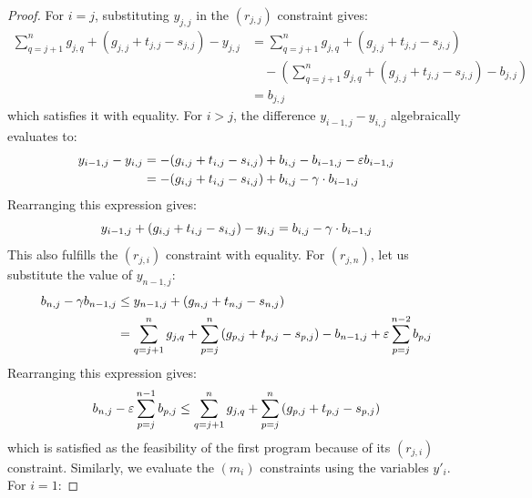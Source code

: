 \begin{proof}
    For $i=j$, substituting $y_{j,j}$ in the $(r_{j,j})$ constraint gives:
    \begin{align*}
        \sum_{q=j+1}^n g_{j,q} + (g_{j,j} + t_{j,j} - s_{j,j}) - y_{j,j}
        &=  \sum_{q=j+1}^n g_{j,q} + (g_{j,j} + t_{j,j} - s_{j,j}) \\
        &\quad - \left(\sum_{q=j+1}^n g_{j,q} + (g_{j,j} + t_{j,j} - s_{j,j}) - b_{j,j}\right) \\
        &= b_{j,j}
    \end{align*}
    which satisfies it with equality. For $i>j$, the difference $y_{i-1,j} - y_{i,j}$ algebraically evaluates to:
    \begin{align*}
        y_{i-1,j} - y_{i,j} 
        &= -(g_{i,j} + t_{i,j} - s_{i,j}) + b_{i,j} - b_{i-1,j} - \varepsilon b_{i-1,j} \\
        &= -(g_{i,j} + t_{i,j} - s_{i,j}) + b_{i,j} - \gamma\cdot b_{i-1,j}
    \end{align*}
    Rearranging this expression gives:
    \begin{equation*}
        y_{i-1,j} + (g_{i,j} + t_{i,j} - s_{i,j}) - y_{i,j} = b_{i,j} - \gamma\cdot b_{i-1,j}
    \end{equation*}
    This also fulfills the $(r_{j,i})$ constraint with equality. For $(r_{j,n})$, let us substitute the value of $y_{n-1,j}$:
    \begin{align*}
        b_{n,j} - \gamma b_{n-1,j}
        &\leq y_{n-1,j} + (g_{n,j} + t_{n,j} - s_{n,j}) \\
        &= \sum_{q=j+1}^n g_{j,q} + \sum_{p=j}^{n} \left(g_{p,j} + t_{p,j} - s_{p,j}\right) - b_{n-1,j} + \varepsilon \sum_{p=j}^{n-2} b_{p,j}
    \end{align*}
    Rearranging this expression gives:
    \begin{equation*}
        b_{n,j} - \varepsilon \sum_{p=j}^{n-1} b_{p,j} \leq \sum_{q=j+1}^n g_{j,q} + \sum_{p=j}^{n} \left(g_{p,j} + t_{p,j} - s_{p,j}\right)
    \end{equation*}
    which is satisfied as the feasibility of the first program because of its $(r_{j,i})$ constraint.
    Similarly, we evaluate the $(m_i)$ constraints using the variables $y'_i$. For $i=1$:

\end{proof}
